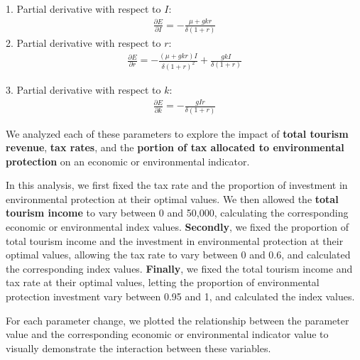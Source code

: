 \documentclass[UTF8]{mcmthesis}
\begin{document}
        1. Partial derivative with respect to \( I \):
        \begin{equation}
            \begin{aligned}
            \frac{\partial E}{\partial I} = -\frac{\mu + gkr}{\delta(1 + r)}
            \end{aligned}
            \end{equation}
        \hspace*{2em}2. Partial derivative with respect to \( r \):
        \begin{equation}
            \begin{aligned}
            \frac{\partial E}{\partial r} = -\frac{(\mu + gkr)I}{\delta(1 + r)^2} + \frac{gkI}{\delta(1 + r)}
            \end{aligned}
            \end{equation}

        3. Partial derivative with respect to \( k \):
        \begin{equation}
            \begin{aligned}
            \frac{\partial E}{\partial k} = -\frac{gIr}{\delta(1 + r)}
            \end{aligned}
            \end{equation}
    
            We analyzed each of these parameters to explore the impact of \textbf{total tourism revenue}, \textbf{tax rates}, and the \textbf{portion of tax allocated to environmental protection} on an economic or environmental indicator.

            In this analysis, we first fixed the tax rate and the {proportion of investment in environmental protection} at their optimal values. We then allowed the \textbf{total tourism income} to vary between 0 and 50,000, calculating the corresponding economic or environmental index values. \textbf{Secondly}, we fixed the {proportion of total tourism income} and the investment in environmental protection at their optimal values, allowing the {tax rate} to vary between 0 and 0.6, and calculated the corresponding index values. \textbf{Finally}, we fixed the {total tourism income} and {tax rate} at their optimal values, letting the {proportion of environmental protection investment} vary between 0.95 and 1, and calculated the index values.
            
            For each parameter change, we plotted the relationship between the parameter value and the corresponding economic or environmental indicator value to visually demonstrate the interaction between these variables.
            
\end{document}
